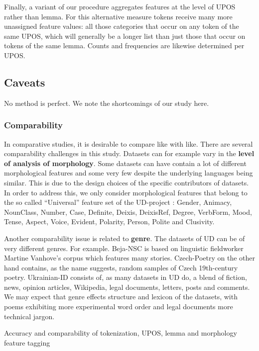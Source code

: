 \documentclass[USenglish]{article}
\begin{document}
Finally, a variant of our procedure aggregates features at the level of UPOS rather than lemma.
For this alternative measure tokens receive many more unassigned feature values: all those categories that occur on any token of the same UPOS, which will generally be a longer list than just those that occur on tokens of the same lemma.
Counts and frequencies are likewise determined per UPOS.





\subsection{Caveats}
No method is perfect. We note the shortcomings of our study here. 

\subsubsection{Comparability}
In comparative studies, it is desirable to compare like with like. There are several comparability challenges in this study. 
Datasets can for example vary in the \textbf{level of analysis of morphology}. 
Some datasets can have contain a lot of different morphological features and some very few despite the underlying languages being similar. 
This is due to the design choices of the specific contributors of datasets. 
In order to address this, we only consider morphological features that belong to the so called ``Universal'' feature set of the UD-project \citep{ud_2_feat_website}: Gender, Animacy, NounClass, Number, Case, Definite, Deixis, DeixisRef, Degree, VerbForm, Mood, Tense, Aspect, Voice, Evident, Polarity, Person, Polite and Clusivity.

Another comparability issue is related to \textbf{genre}. The datasets of UD can be of very different genres. For example. Beja-NSC is based on linguistic fieldworker Martine Vanhove's corpus which features many stories. Czech-Poetry on the other hand contains, as the name suggests, random samples of Czech 19th-century poetry. Ukrainian-ID consists of, as many datasets in UD do, a blend of fiction, news, opinion articles, Wikipedia, legal documents, letters, posts and comments. We may expect that genre effects structure and lexicon of the datasets, with poems exhibiting more experimental word order and legal documents more technical jargon. 



Accuracy and comparability of tokenization, UPOS, lemma and morphology feature tagging
\end{document}
